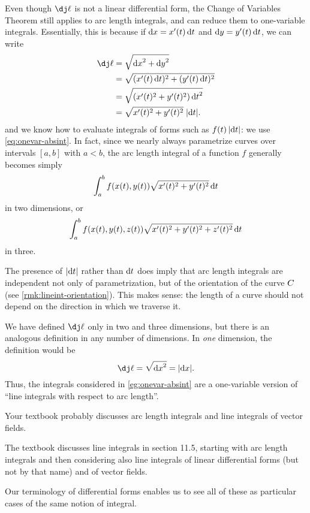 \documentclass[12pt]{amsart}
\begin{document}
Even though $\dl$ is not a linear differential form, the Change of Variables Theorem still applies to arc length integrals, and can reduce them to one-variable integrals.
Essentially, this is because if ${\mathrm{d} x} = x'(t) \,{\mathrm{d} t}$ and ${\mathrm{d} y} = y'(t)\,{\mathrm{d} t}$, we can write
\begin{align*}
  \dl &= \sqrt{\dx^2+\dy^2}\\
  &= \sqrt{(x'(t)\,\dt)^2 + (y'(t)\,\dt)^2}\\
  &= \sqrt{(x'(t)^2 + y'(t)^2) \,\dt^2}\\
  &= \sqrt{x'(t)^2 + y'(t)^2} \;|\dt|.
\end{align*}
and we know how to evaluate integrals of forms such as $f(t)\,|{\mathrm{d} t}|$: we use \cref{eq:onevar-absint}.
In fact, since we nearly always parametrize curves over intervals $[a,b]$ with $a<b$, the arc length integral of a function $f$ generally becomes simply
\[ \int_a^b f(x(t),y(t)) \sqrt{x'(t)^2 + y'(t)^2} \,{\mathrm{d} t} \]
in two dimensions, or
\[ \int_a^b f(x(t),y(t),z(t)) \sqrt{x'(t)^2 + y'(t)^2+z'(t)^2} \,{\mathrm{d} t} \]
in three.


\begin{rmk}
  The presence of $|{\mathrm{d} t}|$ rather than ${\mathrm{d} t}$ does imply that arc length integrals are independent not only of parametrization, but of the orientation of the curve $C$ (see \cref{rmk:lineint-orientation}).
  This makes sense: the length of a curve should not depend on the direction in which we traverse it.
\end{rmk}

\begin{rmk}
  We have defined $\dl$ only in two and three dimensions, but there is an analogous definition in any number of dimensions.
  In \emph{one} dimension, the definition would be
  \[ \dl = \sqrt{\dx^2} = |\dx|. \]
  Thus, the integrals considered in \cref{eg:onevar-absint} are a one-variable version of ``line integrals with respect to arc length''.
\end{rmk}

\begin{notextbook}Your textbook probably discusses arc length integrals and line integrals of vector fields.\end{notextbook}
\begin{stewart}The textbook discusses line integrals in section 11.5, starting with arc length integrals and then considering also line integrals of linear differential forms (but not by that name) and of vector fields.\end{stewart}
Our terminology of differential forms enables us to see all of these as particular cases of the same notion of integral.
\end{document}

